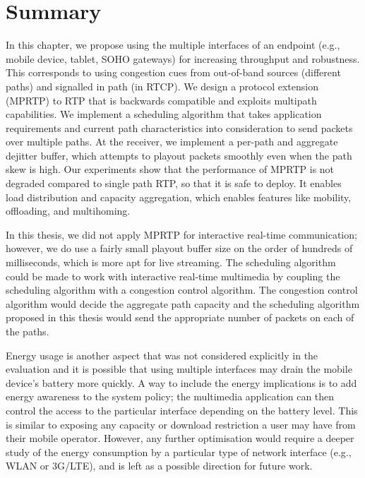 

\section{Summary}

In this chapter, we propose using the multiple interfaces of an endpoint (e.g.,
mobile device, tablet, SOHO gateways) for increasing throughput and
robustness. This corresponds to using congestion cues from out-of-band  sources
(different paths) and signalled in path (in RTCP). We design a protocol
extension (MPRTP) to RTP that is backwards compatible and exploits multipath
capabilities. We implement a scheduling algorithm that takes application
requirements and current path characteristics into consideration to send
packets over multiple paths. At the receiver, we implement a per-path and
aggregate dejitter buffer, which attempts to playout packets smoothly even
when the path skew is high. Our experiments show that the performance of MPRTP
is not degraded compared to single path RTP, so that it is safe to deploy. It
enables load distribution and capacity aggregation, which enables features
like mobility, offloading, and multihoming.

In this thesis, we did not apply MPRTP for interactive real-time
communication; however, we do use a fairly small playout buffer size on the order of
hundreds of milliseconds, which is more apt for live streaming. The scheduling
algorithm could be made to work with interactive real-time multimedia by
coupling the scheduling algorithm with a congestion control algorithm. The
congestion control algorithm would decide the aggregate path capacity and the
scheduling algorithm proposed in this thesis would send the appropriate number
of packets on each of the paths.

Energy usage is another aspect that was not considered explicitly in the
evaluation and it is possible that using multiple interfaces may drain the
mobile device's battery more quickly. A way to include the energy implications
is to add energy awareness to the system policy; the multimedia application
can then control the access to the particular interface depending on the
battery level. This is similar to exposing any capacity or download
restriction a user may have from their mobile operator. However, any further
optimisation would require a deeper study of the energy consumption by a
particular type of network interface (e.g., WLAN or 3G/LTE), and is left as a
possible direction for future work.
